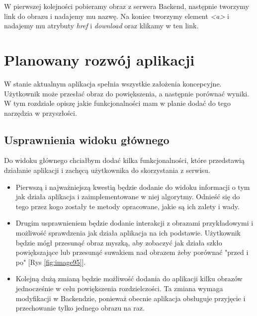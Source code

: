 W pierwszej kolejności pobieramy obraz z serwera Backend, następnie tworzymy link do obrazu i nadajemy mu nazwę. Na koniec tworzymy element \textit{<a>} i nadajemy mu atrybuty \textit{href} i \textit{download} oraz klikamy w ten link.


\section{Planowany rozwój aplikacji} \label{sec:plans}

W stanie aktualnym aplikacja spełnia wszystkie założenia koncepcyjne. Użytkownik może przesłać obraz do powiększenia, a następnie porównać wyniki. W tym rozdziale opiszę jakie funkcjonalności mam w planie dodać do tego narzędzia w przyszłości.

\subsection*{Usprawnienia widoku głównego}

Do widoku głównego chciałbym dodać kilka funkcjonalności, które przedstawią działanie aplikacji i zachęcą użytkownika do skorzystania z serwisu.

\begin{itemize}
    \item Pierwszą i najważniejszą kwestią będzie dodanie do widoku informacji o tym jak działa aplikacja i zaimplementowane w niej algorytmy. Odnieść się do tego przez kogo zostały te metody opracowane, jakie są ich zalety i wady.
    \item Drugim usprawnieniem będzie dodanie interakcji z obrazami przykładowymi i możliwość sprawdzenia jak działa aplikacja na ich podstawie. Użytkownik będzie mógł przesunąć obraz myszką, aby zobaczyć jak działa szkło powiększające lub przesunąć suwakiem nad obrazem żeby porównać "przed i po" [Rys \ref{fig:image95}].
    \item Kolejną dużą zmianą będzie możliwość dodania do aplikacji kilku obrazów jednocześnie w celu powiększenia rozdzielczości. Ta zmiana wymaga modyfikacji w Backendzie, ponieważ obecnie aplikacja obsługuje przyjęcie i przechowanie tylko jednego obrazu na raz.
\end{itemize}

